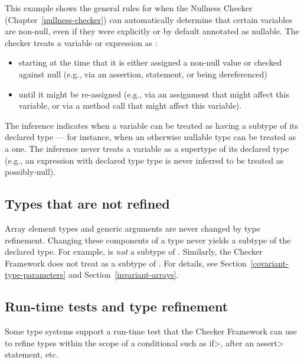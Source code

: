 This example shows the general rules for when
the Nullness Checker (Chapter~\ref{nullness-checker}) can automatically
determine that certain variables are non-null, even if they were explicitly
or by default annotated as nullable.
The checker treats a variable or expression as :
\begin{itemize}
\item
starting at the time that it is either
assigned a non-null value or checked against null (e.g., via an assertion,
 statement, or being dereferenced)
\item
until it might be re-assigned (e.g.,
via an assignment that might affect this variable, or via a method call
that might affect this variable).
\end{itemize}


The inference indicates when a variable can be treated as having a subtype
of its declared type --- for instance, when an otherwise nullable type can be
treated as a  one.  The inference never treats a variable as
a supertype of its declared type (e.g., an expression with declared type 
type is never inferred to be treated as possibly-null).



\subsection{Types that are not refined\label{type-refinement-types-that-are-not-refined}}

Array element types and generic arguments are never changed by type
refinement.  Changing these components of a type never yields a subtype of
the declared type.
For example,  is \emph{not} a
subtype of .  Similarly, the Checker Framework does not
treat  as a subtype of
.
For details, see Section~\ref{covariant-type-parameters} and
Section~\ref{invariant-arrays}.


\subsection{Run-time tests and type refinement\label{type-refinement-runtime-tests}}

Some type systems support a run-time test that the Checker Framework can
use to refine types within the scope of a conditional such as \<if>, after
an \<assert> statement, etc.

